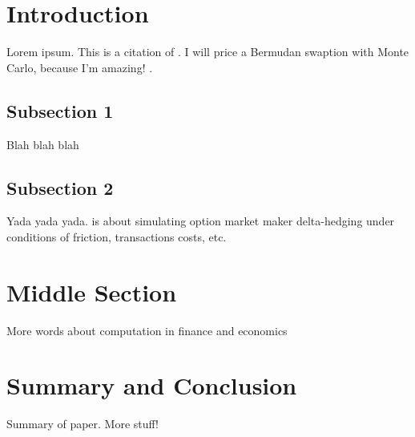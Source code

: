 \documentclass[11pt,]{article}
\begin{document}
\section{Introduction}\label{introduction}

Lorem ipsum. This is a citation of \citet{Buchanan1979}. I will price a
Bermudan swaption with Monte Carlo, because I'm amazing!
\citet{Hayek1945}.

\subsection{Subsection 1}\label{subsection-1}

Blah blah blah

\subsection{Subsection 2}\label{subsection-2}

Yada yada yada. \citet{Figlewski1989} is about simulating option market
maker delta-hedging under conditions of friction, transactions costs,
etc.

\section{Middle Section}\label{middle-section}

More words about computation in finance and economics

\section{Summary and Conclusion}\label{summary-and-conclusion}

Summary of paper. More stuff!

\newpage
\singlespacing 

\end{document}
